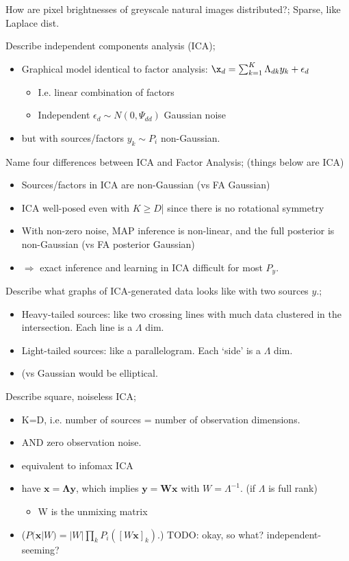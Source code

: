 \documentclass{article}
\begin{document}
How are pixel brightnesses of greyscale natural images distributed?; Sparse, like Laplace dist.

Describe independent components analysis (ICA); \begin{itemize}
    \item Graphical model identical to factor analysis: $\x_d=\sum_{k=1}^K\Lambda_{dk}y_k+\epsilon_d$
    \begin{itemize}
        \item I.e. linear combination of factors
        \item Independent $\epsilon_d\sim N(0, \Psi_{dd})$ Gaussian noise
    \end{itemize}
    \item but with sources/factors $y_k\sim P_i$ non-Gaussian.
\end{itemize}

Name four differences between ICA and Factor Analysis; (things below are ICA) \begin{itemize}
    \item Sources/factors in ICA are non-Gaussian (vs FA Gaussian)
    \item ICA well-posed even with $K\geq D$| since there is no rotational symmetry
    \item With non-zero noise, MAP inference is non-linear, and the full posterior is non-Gaussian (vs FA posterior Gaussian)
    \item $\Rightarrow$ exact inference and learning in ICA difficult for most $P_y$.
\end{itemize}

Describe what graphs of ICA-generated data looks like with two sources $y$.; \begin{itemize}
    \item Heavy-tailed sources: like two crossing lines with much data clustered in the intersection. Each line is a $\Lambda$ dim.
    \item Light-tailed sources: like a parallelogram. Each `side' is a $\Lambda$ dim.
    \item (vs Gaussian would be elliptical.
\end{itemize}

Describe square, noiseless ICA; \begin{itemize}
    \item K=D, i.e. number of sources = number of observation dimensions.
    \item AND zero observation noise.
    \item equivalent to infomax ICA
    \item have $\mathbf{x=\Lambda y}$, which implies $\mathbf{y=Wx}$ with $W=\Lambda^{-1}$. (if $\Lambda$ is full rank)
    \begin{itemize}
        \item W is the unmixing matrix
    \end{itemize}
    \item ($P(\mathbf{x}|W)=|W|\prod_kP_i([W\mathbf{x}]_k)$.) TODO: okay, so what? independent-seeming?
\end{itemize}
\end{document}
